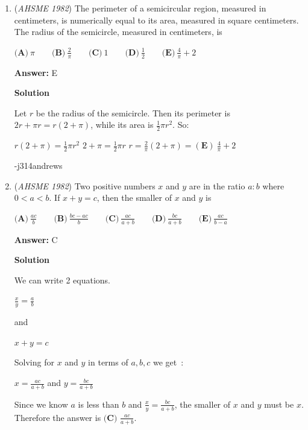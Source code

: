 \begin{enumerate}
\textbf{Solution}

Plugging in $2$ as $x$ gives $4^4$, which is merely $\boxed{\text{(C)} \ 256 }$.

 


	\item (\textit{AHSME 1982}) The perimeter of a semicircular region, measured in centimeters, is numerically equal to its area, 
measured in square centimeters. The radius of the semicircle, measured in centimeters, is 


 $\textbf{(A)} \ \pi \qquad  \textbf{(B)} \ \frac{2}{\pi} \qquad  \textbf{(C)} \ 1 \qquad  \textbf{(D)} \ \frac{1}{2}\qquad \textbf{(E)} \ \frac{4}{\pi}+2$

 \textbf{Answer: }E



\textbf{Solution}

Let $r$ be the radius of the semicircle.  Then its perimeter is $2r + \pi r = r(2 + \pi)$, while its area is $\frac{1}{2}\pi r^2$.  So:

 $r(2 + \pi) = \frac{1}{2}\pi r^2$
$2 + \pi = \frac{1}{2}\pi r$
$r = \frac{2}{\pi}(2 + \pi) = \boxed{(\mathbf{E})\ \frac{4}{\pi} + 2}$

 -j314andrews

 


	\item (\textit{AHSME 1982}) Two positive numbers $x$ and $y$ are in the ratio $a: b$ where $0 < a < b$. If $x+y = c$, then the smaller of $x$ and $y$ is 


 $\textbf{(A)} \ \frac{ac}{b} \qquad  \textbf{(B)} \ \frac{bc-ac}{b} \qquad  \textbf{(C)} \ \frac{ac}{a+b} \qquad  \textbf{(D)}\ \frac{bc}{a+b}\qquad \textbf{(E)}\ \frac{ac}{b-a}$

 \textbf{Answer: }C



\textbf{Solution}

We can write 2 equations.

 $\frac{x}{y}=\frac{a}{b}$

 and

 $x+y=c$

 Solving for $x$ and $y$ in terms of $a, b, c$ we get :

 $x=\frac{ac}{a+b}$ and $y=\frac{bc}{a+b}$

 Since we know $a$ is less than $b$ and $\frac{x}{y}=\frac{bc}{a+b}$, the smaller of $x$ and $y$ must be $x$. Therefore the answer is $\boxed{\textbf{(C) }\frac{ac}{a+b}}$.

 



\end{enumerate}
